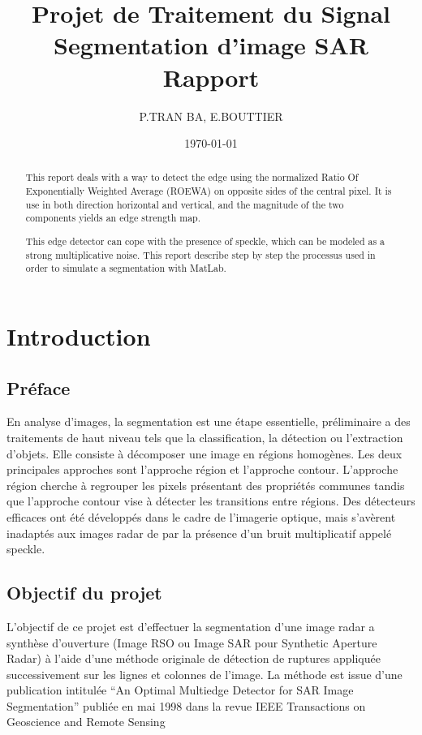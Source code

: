 \documentclass[a4paper,11pt]{article}
\title{Projet de Traitement du Signal\\Segmentation d'image SAR\\Rapport}
\author{P.TRAN BA, E.BOUTTIER}
\date\today
\begin{document}
\maketitle

\begin{abstract}

This report deals with a way to detect the edge using the normalized Ratio Of Exponentially Weighted Average (ROEWA) on opposite sides of the central pixel. It is use in both direction horizontal and vertical, and the magnitude of the two components yields an edge strength map.

This edge detector can cope with the presence of speckle, which can be modeled as a strong multiplicative noise. This report describe step by step the processus used in order to simulate a segmentation with MatLab.

\end{abstract}

\tableofcontents

\newpage

\section{Introduction}
\subsection{Préface}

En analyse d'images, la segmentation est une étape essentielle, préliminaire a des traitements de haut niveau tels que la classification, la détection ou l'extraction d'objets. Elle consiste à décomposer une image en régions homogènes. Les deux principales approches sont l'approche région et l'approche contour. L'approche région cherche à regrouper les pixels présentant des propriétés communes tandis que l'approche contour vise à détecter les transitions entre régions. Des détecteurs efficaces ont été développés dans le cadre de l'imagerie optique, mais s'avèrent inadaptés aux images radar de par la présence d'un bruit multiplicatif appelé speckle.

\subsection{Objectif du projet}

L'objectif de ce projet est d'effectuer la segmentation d'une image radar a synthèse d'ouverture (Image RSO ou Image SAR pour Synthetic Aperture Radar) à l'aide d'une méthode originale de détection de
ruptures appliquée successivement sur les lignes et colonnes de l'image. La méthode
est issue d'une publication intitulée “An Optimal Multiedge Detector for SAR Image
Segmentation” publiée en mai 1998 dans la revue IEEE Transactions on Geoscience
and Remote Sensing
\end{document}
